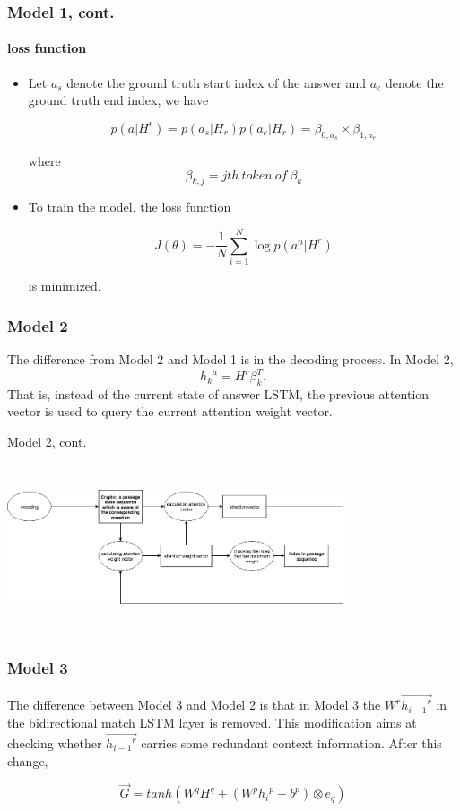 \documentclass{beamer}
\begin{document}
\begin{frame}\frametitle{Model 1, cont.}\framesubtitle{loss function}
    \begin{itemize}
        \item Let $a_s$ denote the ground truth start index of the answer and $a_e$ denote the ground truth end index, we have

        $$p(a|H^r) = p(a_s|H_r)p(a_e|H_r)=\beta _{0, a_s} \times \beta_{1, a_e}$$

        where $$\beta_{k, j} = jth\ token\ of\ \beta _k$$
        \item To train the model, the loss function

        $$J(\theta) = -\frac{1}{N}\sum_{i=1}^{N} \log{p(a^n|H^r)} $$

        is minimized.

    \end{itemize}

\end{frame}

\begin{frame} \frametitle{Model 2}
    The difference from Model 2 and Model 1 is in the decoding process. In Model 2,
    $${h_k}^a = H^r\beta _{k}^T.$$
    That is, instead of the current state of answer LSTM, the previous attention vector is used to query the current attention weight vector.
\end{frame}


\begin{frame}{Model 2, cont.}
    \begin{center}
        \includegraphics[width=10cm, height=5cm]{figures/model2_decoder.png}
    \end{center}
\end{frame}



\begin{frame} \frametitle{Model 3}
    The difference between Model 3 and Model 2 is that in Model 3 the $W^r\overrightarrow{{h_{i-1}}^r}$ in the bidirectional match LSTM layer is removed. This modification aims at checking whether $\overrightarrow{{h_{i-1}}^r}$ carries some redundant context information. After this change,


    $$\overrightarrow{G} = tanh(W^qH^q + (W^p{h_i}^p + b^p) \otimes e_q)$$
\end{frame}
\end{document}
